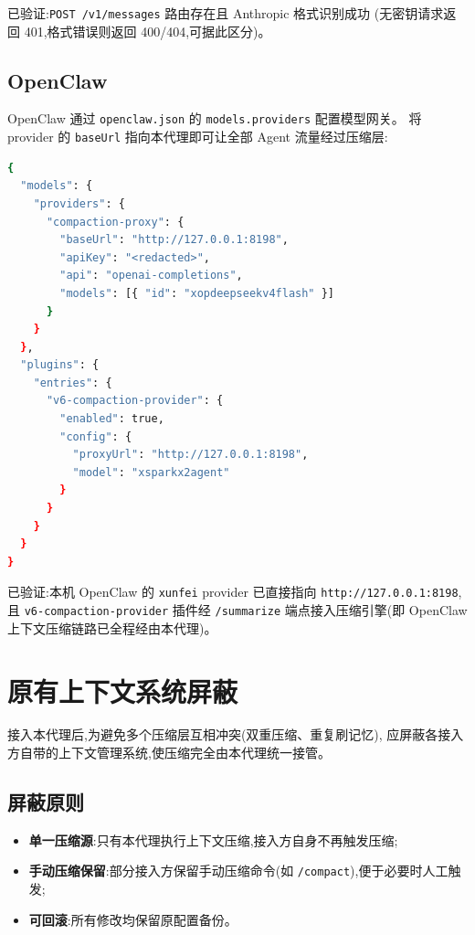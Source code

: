 \documentclass[11pt,a4paper]{article}
\begin{document}
已验证:\texttt{POST /v1/messages} 路由存在且 Anthropic 格式识别成功
(无密钥请求返回 401,格式错误则返回 400/404,可据此区分)。

\subsection{OpenClaw}

OpenClaw 通过 \texttt{openclaw.json} 的 \texttt{models.providers} 配置模型网关。
将 provider 的 \texttt{baseUrl} 指向本代理即可让全部 Agent 流量经过压缩层:

\begin{lstlisting}[language=bash]
{
  "models": {
    "providers": {
      "compaction-proxy": {
        "baseUrl": "http://127.0.0.1:8198",
        "apiKey": "<redacted>",
        "api": "openai-completions",
        "models": [{ "id": "xopdeepseekv4flash" }]
      }
    }
  },
  "plugins": {
    "entries": {
      "v6-compaction-provider": {
        "enabled": true,
        "config": {
          "proxyUrl": "http://127.0.0.1:8198",
          "model": "xsparkx2agent"
        }
      }
    }
  }
}
\end{lstlisting}

已验证:本机 OpenClaw 的 \texttt{xunfei} provider 已直接指向
\texttt{http://127.0.0.1:8198},且 \texttt{v6-compaction-provider} 插件经
\texttt{/summarize} 端点接入压缩引擎(即 OpenClaw 上下文压缩链路已全程经由本代理)。

\section{原有上下文系统屏蔽}

接入本代理后,为避免多个压缩层互相冲突(双重压缩、重复刷记忆),
应屏蔽各接入方自带的上下文管理系统,使压缩完全由本代理统一接管。

\subsection{屏蔽原则}

\begin{itemize}
  \item \textbf{单一压缩源}:只有本代理执行上下文压缩,接入方自身不再触发压缩;
  \item \textbf{手动压缩保留}:部分接入方保留手动压缩命令(如
        \texttt{/compact}),便于必要时人工触发;
  \item \textbf{可回滚}:所有修改均保留原配置备份。
\end{itemize}
\end{document}
